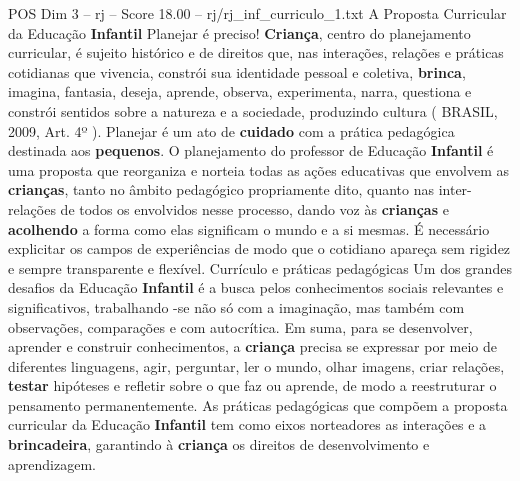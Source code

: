 \begin{textsample}{POS Dim 3 – rj – Score 18.00 – rj/rj\_inf\_curriculo\_1.txt}  \label{ex:f3_pos_017}
A Proposta Curricular da Educação \textbf{Infantil} Planejar é preciso! \textbf{Criança}, centro do planejamento curricular, é sujeito histórico e de direitos que, nas interações, relações e práticas cotidianas que vivencia, constrói sua identidade pessoal e coletiva, \textbf{brinca}, imagina, fantasia, deseja, aprende, observa, experimenta, narra, questiona e constrói sentidos sobre a natureza e a sociedade, produzindo cultura ( BRASIL, 2009, Art. 4º ).
Planejar é um ato de \textbf{cuidado} com a prática pedagógica destinada aos \textbf{pequenos}.
O planejamento do professor de Educação \textbf{Infantil} é uma proposta que reorganiza e norteia todas as ações educativas que envolvem as \textbf{crianças}, tanto no âmbito pedagógico propriamente dito, quanto nas inter-relações de todos os envolvidos nesse processo, dando voz às \textbf{crianças} e \textbf{acolhendo} a forma como elas significam o mundo e a si mesmas.
É necessário explicitar os campos de experiências de modo que o cotidiano apareça sem rigidez e sempre transparente e flexível.
Currículo e práticas pedagógicas Um dos grandes desafios da Educação \textbf{Infantil} é a busca pelos conhecimentos sociais relevantes e significativos, trabalhando -se não só com a imaginação, mas também com observações, comparações e com autocrítica.
Em suma, para se desenvolver, aprender e construir conhecimentos, a \textbf{criança} precisa se expressar por meio de diferentes linguagens, agir, perguntar, ler o mundo, olhar imagens, criar relações, \textbf{testar} hipóteses e refletir sobre o que faz ou aprende, de modo a reestruturar o pensamento permanentemente.
As práticas pedagógicas que compõem a proposta curricular da Educação \textbf{Infantil} tem como eixos norteadores as interações e a \textbf{brincadeira}, garantindo à \textbf{criança} os direitos de desenvolvimento e aprendizagem.

\end{textsample}
